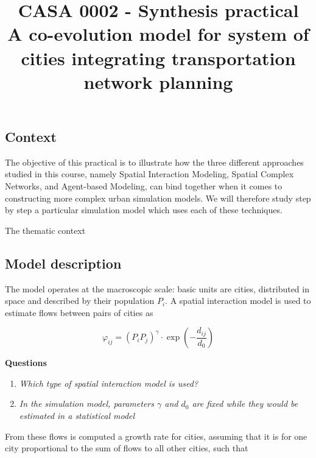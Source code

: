\documentclass[11pt]{article}
\begin{document}

\title{CASA 0002 - Synthesis practical\\\medskip
A co-evolution model for system of cities integrating transportation network planning
}

\date{}

\maketitle

\subsection*{Context}

The objective of this practical is to illustrate how the three different approaches studied in this course, namely Spatial Interaction Modeling, Spatial Complex Networks, and Agent-based Modeling, can bind together when it comes to constructing more complex urban simulation models. We will therefore study step by step a particular simulation model which uses each of these techniques.

\medskip

The thematic context 


\subsection*{Model description}

The model operates at the macroscopic scale: basic units are cities, distributed in space and described by their population $P_i$. A spatial interaction model is used to estimate flows between pairs of cities as

\[
\varphi_{ij} = \left( P_i P_j \right)^{\gamma} \cdot \exp\left(- \frac{d_{ij}}{d_0}\right)
\]

\medskip

\textbf{Questions}

\begin{enumerate}
	\item \textit{Which type of spatial interaction model is used?} %
	\item \textit{In the simulation model, parameters $\gamma$ and $d_0$ are fixed while they would be estimated in a statistical model}
\end{enumerate}


From these flows is computed a growth rate for cities, assuming that it is for one city proportional to the sum of flows to all other cities, such that
\end{document}
